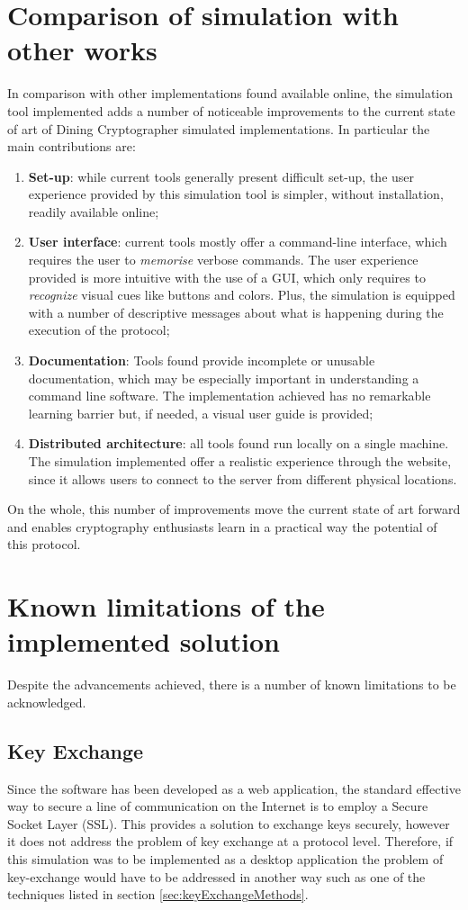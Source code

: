 \section{Comparison of simulation with other works}
In comparison with other implementations found available online, the simulation tool implemented adds a number of noticeable improvements to the current state of art of Dining Cryptographer simulated implementations. In particular the main contributions are:
\begin{enumerate}
    \item \textbf{Set-up}: while current tools generally present difficult set-up, the user experience provided by this simulation tool is simpler, without installation, readily available online;
    \item \textbf{User interface}: current tools mostly offer a command-line interface, which requires the user to \textit{memorise} verbose commands. The user experience provided is more intuitive with the use of a GUI, which only requires to \textit{recognize} visual cues like buttons and colors. Plus, the simulation is equipped with a number of descriptive messages about what is happening during the execution of the protocol;
    \item \textbf{Documentation}: Tools found provide incomplete or unusable documentation, which may be especially important in understanding a command line software. The implementation achieved has no remarkable learning barrier but, if needed, a visual user guide is provided;
    \item \textbf{Distributed architecture}: all tools found run locally on a single machine. The simulation implemented offer a realistic experience through the website, since it allows users to connect to the server from different physical locations.
\end{enumerate}

On the whole, this number of improvements move the current state of art forward and enables cryptography enthusiasts learn in a practical way the potential of this protocol.

\section{Known limitations of the implemented solution}
Despite the advancements achieved, there is a number of known limitations to be acknowledged. 

\subsection{Key Exchange}
Since the software has been developed as a web application, the standard effective way to secure a line of communication on the Internet is to employ a Secure Socket Layer (SSL). This provides a solution to exchange keys securely, however it does not address the problem of key exchange at a protocol level. Therefore, if this simulation was to be implemented as a desktop application the problem of key-exchange would have to be addressed in another way such as one of the techniques listed in section \ref{sec:keyExchangeMethods}.

